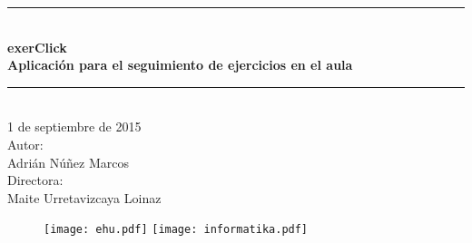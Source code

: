 \pagestyle{empty}

\newcommand{\HRule}{\rule{\linewidth}{0.5mm}} 

\begin{center}
	\HRule \\[0.5cm]
	\vspace{0.5cm}
	\textbf {
		{\huge exerClick}\\
		\vspace{0.3 cm}
		Aplicación para el seguimiento de ejercicios en el aula\\
	}
	\vspace{0.5cm}
	\HRule \\[2.0cm]
	{\large
		1 de septiembre de 2015\\
		\vspace{2.0 cm}
		Autor:\\
		Adrián Núñez Marcos\\
		\vspace{1.0 cm}
		Directora:\\
		Maite Urretavizcaya Loinaz\\
	}

	\vspace{2.0 cm} 
	\begin{figure}[h!]
		\centering
		\texttt{[image: ehu.pdf]}\hfill
		\texttt{[image: informatika.pdf]}
	\end{figure}
\end{center}
